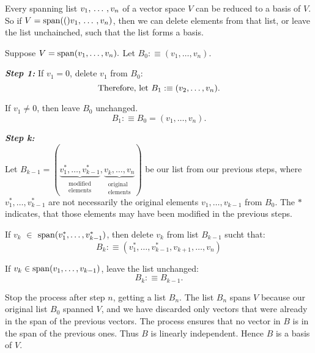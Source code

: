 \setcounter{thm}{29}
\begin{thm} 
  \label{thm: every spanning list contains a basis}
  Every spanning list $v_1, {\, \ldots \,\,}, v_n$ of a vector space $V$ can be reduced to a basis of $V$. So if $V= \operatorname{span} (()v_1, {\, \ldots \,\,}, v_n)$, then we can delete elements from that list, or leave the list unchainched, such that the list forms a basis.
\end{thm}
\begin{prf}
  Suppose $V=\operatorname{span} (v_1, \ldots, v_n).$ Let $B_0 :\equiv (v_1, \ldots, v_n)$.

  \emph{\bfseries Step 1: }
  If $v_1 = 0$, delete $v_1$ from $B_0$:
  \begin{equation}
    $Therefore, let $B_1 :\equiv (v_2, \ldots, v_n).
  \end{equation}

  If $v_1 \neq 0$, then leave $B_0$ unchanged.
  \begin{equation}
    B_1 :\equiv B_0=(v_1, \ldots, v_n).
  \end{equation}

  \emph{\bfseries Step k: } \\
  Let $B_{k-1} = (\underbrace{v_{1}^*, \ldots, v_{k-1}^*}_{\substack{\text{modified} \\ \text{elements}}}, \underbrace{v^{\phantom{*}}_{k}, \ldots, v^{\phantom{*}}_n}_{\substack{\text{original} \\ \text{elements}}})$ be our list from our previous steps, where $v_1^*, \ldots, v_{k-1}^*$ are not necessarily the original elements $v_1, \ldots, v_{k-1}$ from $B_0$. The $*$ indicates, that those elements may have been modified in the previous steps.

  If $v_k$ $\in$ $\operatorname{span} (v_1^*, \ldots, v_{k-1}^*)$, then delete $v_k$ from list $B_{k-1}$ sucht that:
  \begin{equation}
    B_k :\equiv  (v_{1}^*, \ldots, v_{k-1}^*, v_{k+1}, \ldots, v_n)
  \end{equation}



  If $v_k \in \operatorname{span} (v_1, \ldots, v_{k-1})$, leave the list unchanged:
  \begin{equation}
    B_k :\equiv B_{k-1}.
  \end{equation}

  Stop the process after step $n$, getting a list $B_n$. The list $B_n$ spans $V$ because our original list $B_0$ spanned $V$, and we have discarded only vectors that were already in the span of the previous vectors. The process ensures that no vector in $B$ is in the span of the previous ones. Thus $B$ is linearly independent. Hence $B$ is a basis of $V$.
\end{prf}

